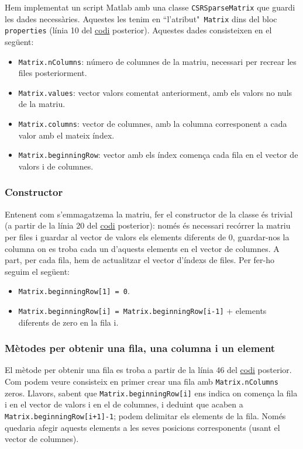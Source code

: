 \documentclass[11pt,a4paper,twoside]{report}
\begin{document}
	Hem implementat un script Matlab amb una classe \texttt{CSRSparseMatrix} que guardi les dades necessàries. Aquestes les tenim en ``l'atribut"\texttt{ Matrix} dins del bloc \texttt{properties} (línia 10 del \hyperref[sec:codi1]{codi} posterior). Aquestes dades consisteixen en el següent:	
	\begin{itemize}
	\item  \texttt{Matrix.nColumns}: número de columnes de la matriu, necessari per recrear les files posteriorment.
	\item  \texttt{Matrix.values}: vector valors comentat anteriorment, amb els valors no nuls de la matriu.
	\item  \texttt{Matrix.columns}: vector de columnes, amb la columna corresponent a cada valor amb el mateix índex.
	\item  \texttt{Matrix.beginningRow}: vector amb els índex comença cada fila en el vector de valors i de columnes.
	\end{itemize}
	
	\subsubsection{Constructor}
	Entenent com s'emmagatzema la matriu, fer el constructor de la classe és trivial (a partir de la línia 20 del \hyperref[sec:codi1]{codi} posterior): només és necessari recórrer la matriu per files i guardar al vector de valors els elements diferents de 0, guardar-nos la columna on es troba cada un d'aquests elements en el vector de columnes. A part, per cada fila, hem de actualitzar el vector d'índexs de files. Per fer-ho seguim el següent:
	\begin{itemize}
	\item \texttt{Matrix.beginningRow[1] = 0}.
	\item \texttt{Matrix.beginningRow[i] = Matrix.beginningRow[i-1]} + elements diferents de zero en la fila i.
	\end{itemize}
	
	\subsubsection{Mètodes per obtenir una fila, una columna i un element}
	
	El mètode per obtenir una fila es troba a partir de la línia 46 del \hyperref[sec:codi1]{codi} posterior. Com podem veure consisteix en primer crear una fila amb \texttt{Matrix.nColumns} zeros.
	Llavors, sabent que \texttt{Matrix.beginningRow[i]} ens indica on comença la fila i en el vector de valors i en el de columnes, i deduint que acaben a \texttt{Matrix.beginningRow[i+1]-1}; podem delimitar els elements de la fila. Només quedaria afegir aquests elements a les seves posicions corresponents (usant el vector de columnes).
	
\end{document}
